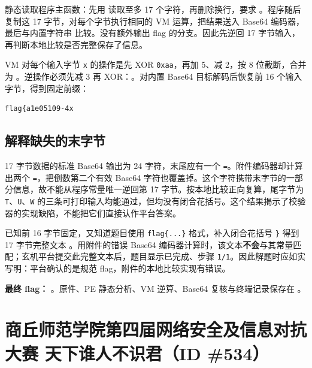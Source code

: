 静态读取程序主函数：先用 \texttt{} 读取至多 17 个字符，再删除换行，要求 \texttt{}。程序随后复制这 17 字节，对每个字节执行相同的 VM 运算，把结果送入 Base64 编码器，最后与内置字符串 \texttt{} 比较。没有额外输出 flag 的分支。因此先逆回 17 字节输入，再判断本地比较是否完整保存了信息。

VM 对每个输入字节 \texttt{x} 的操作是先 XOR \texttt{0xaa}，再加 5、减 2，按 8 位截断，合并为 \texttt{}。逆操作必须先减 3 再 XOR：\texttt{}。对内置 Base64 目标解码后恢复前 16 个输入字节，得到固定前缀：

\begin{verbatim}
flag{a1e05109-4x
\end{verbatim}

\subsection{解释缺失的末字节}\label{ux89e3ux91caux7f3aux5931ux7684ux672bux5b57ux8282}

17 字节数据的标准 Base64 输出为 24 字符，末尾应有一个 \texttt{=}。附件编码器却计算出两个 \texttt{=}，把倒数第二个有效 Base64 字符也覆盖掉。这个字符携带末字节的一部分信息，故不能从程序常量唯一逆回第 17 字节。按本地比较正向复算，尾字节为 \texttt{T}、\texttt{U}、\texttt{W} 的三条可打印输入均能通过，但均没有闭合花括号。这个结果揭示了校验器的实现缺陷，不能把它们直接认作平台答案。

已知前 16 字节固定，又知道题目使用 \texttt{flag\{...\}} 格式，补入闭合花括号 \texttt{\}} 得到 17 字节完整文本 \texttt{}。用附件的错误 Base64 编码器计算时，该文本\textbf{不会}与其常量匹配；玄机平台提交此完整文本后，题目显示已完成、步骤 \texttt{1/1}。因此解题时应如实写明：平台确认的是规范 flag，附件的本地比较实现有错误。

\textbf{最终 flag：} \texttt{}。原件、PE 静态分析、VM 逆算、Base64 复核与终端记录保存在 \texttt{}。

\section{商丘师范学院第四届网络安全及信息对抗大赛 天下谁人不识君（ID \#534）}\label{ux5546ux4e18ux5e08ux8303ux5b66ux9662ux7b2cux56dbux5c4aux7f51ux7edcux5b89ux5168ux53caux4fe1ux606fux5bf9ux6297ux5927ux8d5b-ux5929ux4e0bux8c01ux4ebaux4e0dux8bc6ux541bid-534}

